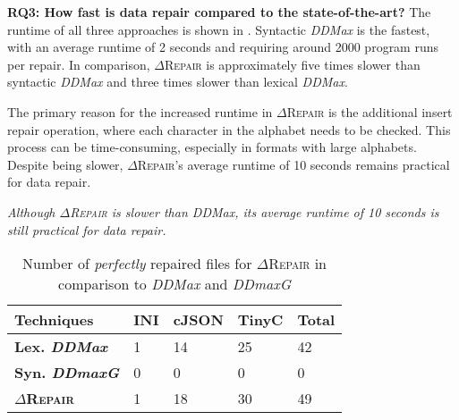 \documentclass[acmsmall,screen,review,anonymous]{acmart}
\newenvironment{result}{\begin{framed}\centering\it}{\end{framed}}
\newcommand{\dtask}{data repair\xspace}
\newcommand{\approach}{\textsc{$\Delta$Repair}\xspace}
\newcommand{\ddmax}{\textit{DDMax}\xspace}
\newcommand{\ddmaxg}{\textit{DDmaxG}\xspace}
\newcommand{\drepair}{\approach}
\begin{document}
\noindent\textbf{RQ3: How fast is \dtask compared to the state-of-the-art?}
The runtime of all three approaches is shown in .
Syntactic \ddmax is the fastest, with an average runtime of 2 seconds and
requiring around 2000 program runs per repair.
In comparison, \drepair is approximately five times slower than syntactic
\ddmax and three times slower than lexical \ddmax.

The primary reason for the increased runtime in \drepair is the additional
insert repair operation, where each character in the alphabet needs to be
checked. This process can be time-consuming, especially in formats with
large alphabets.
Despite being slower, \drepair's average runtime of 10 seconds remains practical
for \dtask.

\begin{result}
Although \drepair is slower than \ddmax, its average runtime of 10 seconds is
still practical for \dtask.
\end{result}

\begin{table}[!tbp]\centering
\caption{Number of \textit{perfectly} repaired files for \approach in comparison to \ddmax and \ddmaxg
}
\begin{tabular}{|p{4.0cm}|p{1.5cm}|p{1.5cm}|p{1.5cm}|p{1.5cm}|}
\hline
\textbf{Techniques}&  \textbf{INI}&\textbf{cJSON} &\textbf{TinyC}&\textbf{Total}  \\
\hline
\textbf{Lex. \ddmax}  & 1 & 14 & 25 & 42 \\
\textbf{Syn. \ddmaxg} & 0 & 0  & 0  & 0  \\
\hline
\textbf{\approach} &  1 & 18  & 30 & 49  \\
\hline
\end{tabular}
\label{tab:perfectrepairs}
\end{table}
\end{document}
